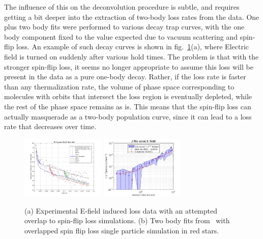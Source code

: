 \documentclass[%
 reprint,
 amsmath,amssymb,
 aps,
prl,
]{revtex4-1}
\begin{document}
The influence of this on the deconvolution procedure is subtle, and requires getting a bit deeper into the extraction of two-body loss rates from the data. 
One plus two body fits were performed to various decay trap curves, with the one body component fixed to the value expected due to vacuum scattering and spin-flip loss.
An example of  such decay curves is shown in fig.~\ref{fig:eil}(a), where Electric field is turned on suddenly after various hold times.
The problem is that with the stronger spin-flip loss, it seems no longer appropriate to assume this loss will be present in the data as a pure one-body decay.
Rather, if the loss rate is faster than any thermalization rate, the volume of phase space corresponding to molecules with orbits that intersect the loss region is eventually depleted, while the rest of the phase space remains as is.
This means that the spin-flip loss can actually masquerade as a two-body population curve, since it can lead to a loss rate that decreases over time.

\begin{figure}[tb]
\includegraphics[width=4cm]{SuppFigs/EIL.png}%
\includegraphics[width=4cm]{SuppFigs/Beta.png}%
\caption{
(a) Experimental E-field induced loss data with an attempted overlap to spin-flip loss simulations. (b) Two body fits from~\cite{Stuhl2013} with overlapped spin flip loss single particle simulation in red stars.
}
\label{fig:eil}
\end{figure}
\end{document}

